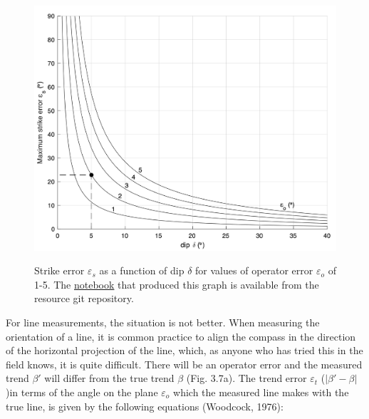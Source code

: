 \documentclass[a4paper , 12pt]{book}
\begin{document}
\begin{figure}[ht]
    \centering
    {\includegraphics[width=13cm]{Figures/ch3f6.png}}
    \caption{Strike error $\varepsilon_s$ as a function of dip $\delta$ for values of operator error $\varepsilon_o$  of 1-5\degree. The \href{http://github.com}{notebook} that produced this graph is available from the resource git repository.}
\end{figure}

For line measurements, the situation is not better. When measuring the orientation of a line, it is common practice to align the compass in the direction of the horizontal projection of the line, which, as anyone who has tried this in the field knows, it is quite difficult. There will be an operator error and the measured trend $\beta\text{$'$}$ will differ from the true trend $\beta$ (Fig. 3.7a). The trend error $\varepsilon_t$ ($|\beta\text{$'$}- \beta|$)in terms of the angle on the plane $\varepsilon_o$ which the measured line makes with the true line, is given by the following equations (Woodcock, 1976): 
\end{document}
